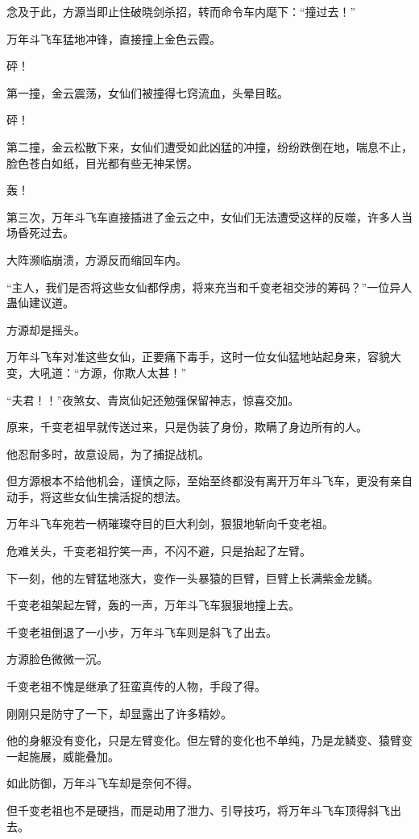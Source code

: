 \begin{this_body}
念及于此，方源当即止住破晓剑杀招，转而命令车内麾下：“撞过去！”

万年斗飞车猛地冲锋，直接撞上金色云霞。

砰！

第一撞，金云震荡，女仙们被撞得七窍流血，头晕目眩。

砰！

第二撞，金云松散下来，女仙们遭受如此凶猛的冲撞，纷纷跌倒在地，喘息不止，脸色苍白如纸，目光都有些无神呆愣。

轰！

第三次，万年斗飞车直接插进了金云之中，女仙们无法遭受这样的反噬，许多人当场昏死过去。

大阵濒临崩溃，方源反而缩回车内。

“主人，我们是否将这些女仙都俘虏，将来充当和千变老祖交涉的筹码？”一位异人蛊仙建议道。

方源却是摇头。

万年斗飞车对准这些女仙，正要痛下毒手，这时一位女仙猛地站起身来，容貌大变，大吼道：“方源，你欺人太甚！”

“夫君！！”夜煞女、青岚仙妃还勉强保留神志，惊喜交加。

原来，千变老祖早就传送过来，只是伪装了身份，欺瞒了身边所有的人。

他忍耐多时，故意设局，为了捕捉战机。

但方源根本不给他机会，谨慎之际，至始至终都没有离开万年斗飞车，更没有亲自动手，将这些女仙生擒活捉的想法。

万年斗飞车宛若一柄璀璨夺目的巨大利剑，狠狠地斩向千变老祖。

危难关头，千变老祖狞笑一声，不闪不避，只是抬起了左臂。

下一刻，他的左臂猛地涨大，变作一头暴猿的巨臂，巨臂上长满紫金龙鳞。

千变老祖架起左臂，轰的一声，万年斗飞车狠狠地撞上去。

千变老祖倒退了一小步，万年斗飞车则是斜飞了出去。

方源脸色微微一沉。

千变老祖不愧是继承了狂蛮真传的人物，手段了得。

刚刚只是防守了一下，却显露出了许多精妙。

他的身躯没有变化，只是左臂变化。但左臂的变化也不单纯，乃是龙鳞变、猿臂变一起施展，威能叠加。

如此防御，万年斗飞车却是奈何不得。

但千变老祖也不是硬挡，而是动用了泄力、引导技巧，将万年斗飞车顶得斜飞出去。


\end{this_body}
